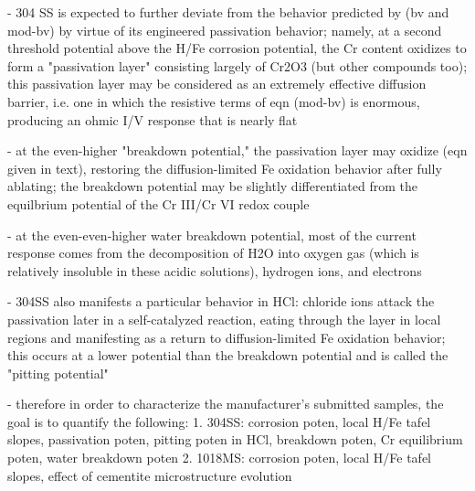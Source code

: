 - 304 SS is expected to further deviate from the behavior predicted by (bv and mod-bv) by virtue of its engineered passivation behavior; namely, at a second threshold potential above the H/Fe corrosion potential, the Cr content oxidizes to form a "passivation layer" consisting largely of Cr2O3 (but other compounds too); this passivation layer may be considered as an extremely effective diffusion barrier, i.e. one in which the resistive terms of eqn (mod-bv) is enormous, producing an ohmic I/V response that is nearly flat

- at the even-higher "breakdown potential," the passivation layer may oxidize (eqn given in text), restoring the diffusion-limited Fe oxidation behavior after fully ablating; the breakdown potential may be slightly differentiated from the equilbrium potential of the Cr III/Cr VI redox couple

- at the even-even-higher water breakdown potential, most of the current response comes from the decomposition of H2O into oxygen gas (which is relatively insoluble in these acidic solutions), hydrogen ions, and electrons

- 304SS also manifests a particular behavior in HCl: chloride ions attack the passivation later in a self-catalyzed reaction, eating through the layer in local regions and manifesting as a return to diffusion-limited Fe oxidation behavior; this occurs at a lower potential than the breakdown potential and is called the "pitting potential"

- therefore in order to characterize the manufacturer's submitted samples, the goal is to quantify the following:
	1. 304SS: corrosion poten, local H/Fe tafel slopes, passivation poten, pitting poten in HCl, breakdown poten, Cr equilibrium poten, water breakdown poten
	2. 1018MS: corrosion poten, local H/Fe tafel slopes, effect of cementite microstructure evolution
\fi
